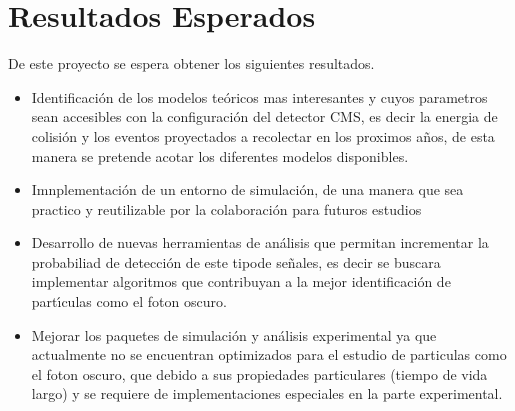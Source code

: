 \chapter{Resultados Esperados} 

De este proyecto se espera obtener los siguientes resultados.

\begin{itemize}
\item Identificaci\'on de los modelos te\'oricos mas interesantes y cuyos parametros sean accesibles con la configuraci\'on del detector CMS, es decir la energia de colisi\'on y los eventos proyectados a recolectar en los proximos a\~nos, de esta manera se pretende acotar los diferentes modelos disponibles.
\item Imnplementaci\'on de un entorno de simulaci\'on, de una manera que sea practico y reutilizable por la colaboraci\'on para futuros estudios
\item Desarrollo de nuevas herramientas de an\'alisis que permitan incrementar la probabiliad de detecci\'on de este tipode se\~nales, es decir se buscara implementar algoritmos que contribuyan a la mejor identificaci\'on de part\'{\i}culas como el foton oscuro.
\item Mejorar los paquetes de simulaci\'on y an\'alisis experimental ya que actualmente no se encuentran optimizados para el estudio de particulas como el foton oscuro, que debido a sus propiedades particulares (tiempo de vida largo) y se requiere de implementaciones especiales en la parte experimental.
\end{itemize}





